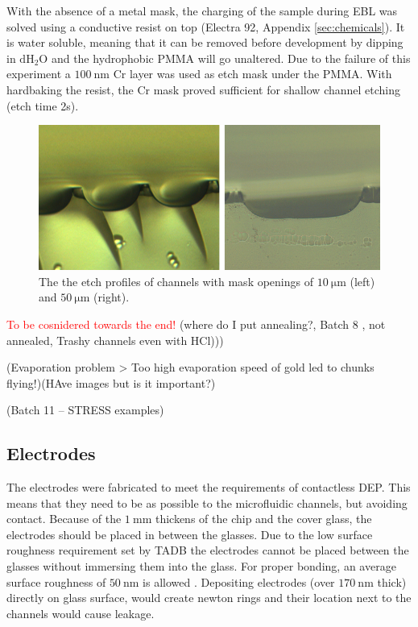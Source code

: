 \documentclass[final]{jyflluk}
\begin{document}
With the absence of a metal mask, the charging of the sample during EBL was solved using a conductive resist on top (Electra 92, Appendix \ref{sec:chemicals}). It is water soluble, meaning that it can be removed before development by dipping in $\mathrm{dH_2O}$ and the hydrophobic PMMA will go unaltered. Due to the failure of this experiment a $\SI{100}{\nano \metre}$ Cr layer was used as etch mask under the PMMA. With hardbaking the resist, the Cr mask proved sufficient for shallow channel etching (etch time 2s).
\begin{figure}
    \centering
    \includegraphics[width=1.0\textwidth]{optical/sideetch.png}
    \caption{The the etch profiles of channels with mask openings of $\SI{10}{\micro \metre}$ (left) and $\SI{50}{\micro \metre}$ (right).}
    \label{fig:sideetch}
\end{figure}
\newline
\newline
\textcolor{red}{To be cosnidered towards the end!}
(where do I put annealing?,  Batch 8 , not annealed, Trashy channels even with HCl)))

(Evaporation problem > Too high evaporation speed of gold led to chunks flying!)(HAve images but is it important?)

(Batch 11 – STRESS examples)

\subsection{Electrodes}
\label{sec:xxx4}

The electrodes were fabricated to meet the requirements of contactless DEP. This means that they need to be as possible to the microfluidic channels, but avoiding contact. Because of the $\SI{1}{\milli \metre}$ thickens of the chip and the cover glass, the electrodes should be placed in between the glasses. Due to the low surface roughness requirement set by TADB the electrodes cannot be placed between the glasses without immersing them into the glass. For proper bonding, an average surface roughness of $\SI{50}{\nano \metre}$ is allowed \cite{chen2009thermal}. Depositing electrodes (over $\SI{170}{\nano \metre}$ thick) directly on glass surface, would create newton rings and their location next to the channels would cause leakage. 
\end{document}
